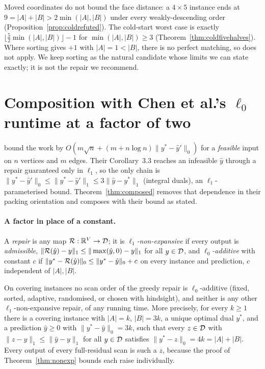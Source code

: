 Moved coordinates do not bound the face distance: a $4\times5$ instance ends at
$9 = |A|+|B| > 2\min(|A|,|B|)$ under every weakly-descending order
(Proposition~\ref{prop:coldrefuted}). The cold-start worst case is
exactly $\lfloor\tfrac52\min(|A|,|B|)\rfloor-1$ for $\min(|A|,|B|) \ge 3$
(Theorem~\ref{thm:coldfivehalves}). Where sorting gives $+1$ with $|A|=1<|B|$, there is no perfect matching, so \citet[Thm.~3.2]{chen2022} does not
apply. We keep sorting as the natural candidate whose limits we can state exactly; it is not the
repair we recommend.

\section{Composition with Chen et al.'s \texorpdfstring{$\ell_0$}{l0} runtime at a factor of two}\label{sec:composition}

\citet[Thm.~3.2]{chen2022} bound the work by $O(m\sqrt{n} + (m + n\log n)\|y^* - \hat{y}'\|_0)$
for a \emph{feasible} input on $n$ vertices and $m$ edges. Their Corollary~3.3 reaches an
infeasible $\hat{y}$ through a repair guaranteed only in $\ell_1$, so the only chain is
$\|y^* - \hat{y}'\|_0 \le \|y^* - \hat{y}'\|_1 \le 3\|\hat{y} - y^*\|_1$ (integral duals), an $\ell_1$-parameterised
bound. Theorem~\ref{thm:composed} removes that dependence in their packing orientation and composes
with their bound as stated.

\paragraph{A factor in place of a constant.} A \emph{repair} is any map $\mathcal{R} : \mathbb{R}^V \to \mathcal{D}$;
it is \emph{$\ell_1$-non-expansive} if every output is \emph{admissible},
$\|\mathcal{R}(\hat y) - y\|_1 \le \|\max(\hat y, 0) - y\|_1$ for all $y \in \mathcal{D}$, and
\emph{$\ell_0$-additive} with constant $c$ if $\|y^* - \mathcal{R}(\hat y)\|_0 \le \|y^* - \hat y\|_0 + c$
on every instance and prediction, $c$ independent of $|A|, |B|$.

\begin{theorem}\label{thm:noadditiveclass}
On covering instances no scan order of the greedy repair is $\ell_0$-additive (fixed, sorted, adaptive, randomised,
or chosen with hindsight), and neither is any other $\ell_1$-non-expansive repair, of any
running time. More precisely, for every $k \ge 1$ there is a covering instance with $|A| = k$,
$|B| = 3k$, a unique optimal dual $y^*$, and a prediction $\hat y \ge 0$ with
$\|y^* - \hat y\|_0 = 3k$, such that every $z \in \mathcal{D}$ with $\|z - y\|_1 \le \|\hat y - y\|_1$
for all $y \in \mathcal{D}$ satisfies $\|y^* - z\|_0 = 4k = |A| + |B|$. Every output of every
full-residual scan is such a $z$, because the proof of Theorem~\ref{thm:nonexp} bounds each raise
individually.
\end{theorem}

